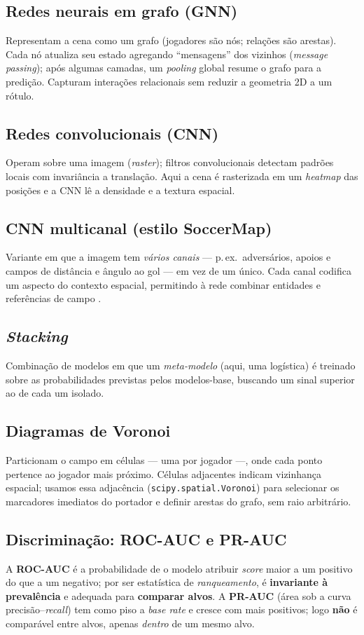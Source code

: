 \documentclass[a4paper,11pt]{article}
\begin{document}
\subsection{Redes neurais em grafo (GNN)}
Representam a cena como um grafo (jogadores são nós; relações são arestas). Cada nó atualiza seu estado agregando ``mensagens'' dos vizinhos (\emph{message passing}); após algumas camadas, um \emph{pooling} global resume o grafo para a predição. Capturam interações relacionais sem reduzir a geometria 2D a um rótulo.

\subsection{Redes convolucionais (CNN)}
Operam sobre uma imagem (\emph{raster}); filtros convolucionais detectam padrões locais com invariância a translação. Aqui a cena é rasterizada em um \emph{heatmap} das posições e a CNN lê a densidade e a textura espacial.

\subsection{CNN multicanal (estilo SoccerMap)}
Variante em que a imagem tem \emph{vários canais} --- p.\,ex.\ adversários, apoios e campos de distância e ângulo ao gol --- em vez de um único. Cada canal codifica um aspecto do contexto espacial, permitindo à rede combinar entidades e referências de campo \citep{fernandez2020soccermap}.

\subsection{\emph{Stacking}}
Combinação de modelos em que um \emph{meta-modelo} (aqui, uma logística) é treinado sobre as probabilidades previstas pelos modelos-base, buscando um sinal superior ao de cada um isolado.

\subsection{Diagramas de Voronoi}
Particionam o campo em células --- uma por jogador ---, onde cada ponto pertence ao jogador mais próximo. Células adjacentes indicam vizinhança espacial; usamos essa adjacência (\texttt{scipy.spatial.Voronoi}) para selecionar os marcadores imediatos do portador e definir arestas do grafo, sem raio arbitrário.

\subsection{Discriminação: ROC-AUC e PR-AUC}
A \textbf{ROC-AUC} é a probabilidade de o modelo atribuir \emph{score} maior a um positivo do que a um negativo; por ser estatística de \emph{ranqueamento}, é \textbf{invariante à prevalência} e adequada para \textbf{comparar alvos}. A \textbf{PR-AUC} (área sob a curva precisão--\emph{recall}) tem como piso a \emph{base rate} e cresce com mais positivos; logo \textbf{não} é comparável entre alvos, apenas \emph{dentro} de um mesmo alvo.
\end{document}
